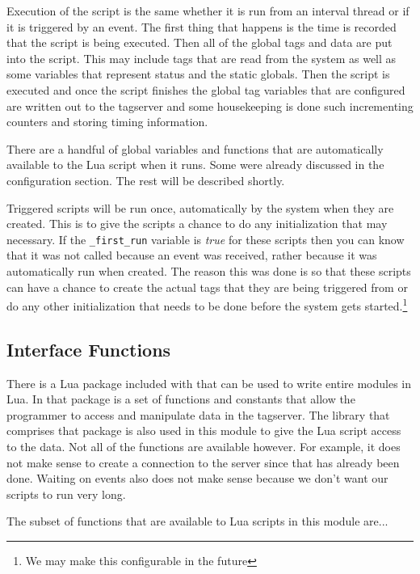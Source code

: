 Execution of the script is the same whether it is run from an interval thread or if
it is triggered by an event.  The first thing that happens is the time is
recorded
that the script is being executed.  Then all of the global
tags and data are put into the script.  This may include tags that are read from the
system as well as some variables that represent status and the static globals.
Then the script is executed and once the script finishes the global tag variables
that are configured are written out to the tagserver and some housekeeping is done such
incrementing counters and storing timing information.

There are a handful of global variables and functions that are automatically available
to the Lua script when it runs.  Some were already discussed in the configuration
section.  The rest will be described shortly.

Triggered scripts will be run once, automatically by the system when they
are created.  This is to give the scripts a chance to do any initialization
that may necessary.  If the \texttt{\_first\_run} variable is \textit{true} for
these scripts then you can know that it was not called because an event
was received, rather because it was automatically run when created.  The
reason this was done is so that these scripts can have a chance to create
the actual tags that they are being triggered from or do any other
initialization that needs to be done before the system gets
started.\footnote{We may make this configurable in the future}

\subsection{\opendax Interface Functions}

There is a Lua package included with \opendax that can be used to write entire \opendax
modules in Lua.
In that package is a set of functions and constants that allow the programmer to access
and manipulate data in the tagserver.  The library that comprises that package is also
used in this module to give the Lua script access to the \opendax data.  Not all of
the functions are available however.  For example, it does not make sense to create
a connection to the server since that has already been done.  Waiting on events also
does not make sense because we don't want our scripts to run very long.

The subset of functions that are available to Lua scripts in this module are...


